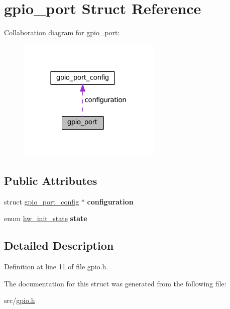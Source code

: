 \hypertarget{structgpio__port}{}\section{gpio\+\_\+port Struct Reference}
\label{structgpio__port}


Collaboration diagram for gpio\+\_\+port\+:\nopagebreak
\begin{figure}[H]
\begin{center}
\leavevmode
\includegraphics[width=194pt]{structgpio__port__coll__graph}
\end{center}
\end{figure}
\subsection*{Public Attributes}
\begin{DoxyCompactItemize}
\item 
\hypertarget{structgpio__port_ad67106287ff2c5d84c528b731374d5e8}{}struct \hyperlink{structgpio__port__config}{gpio\+\_\+port\+\_\+config} $\ast$ {\bfseries configuration}\label{structgpio__port_ad67106287ff2c5d84c528b731374d5e8}

\item 
\hypertarget{structgpio__port_acc0ba075ca33d19af55b06b16edd7ac6}{}enum \hyperlink{hw_8h_a3c02952100e7d051b77cdf060ca0ba9b}{hw\+\_\+init\+\_\+state} {\bfseries state}\label{structgpio__port_acc0ba075ca33d19af55b06b16edd7ac6}

\end{DoxyCompactItemize}


\subsection{Detailed Description}


Definition at line 11 of file gpio.\+h.



The documentation for this struct was generated from the following file\+:\begin{DoxyCompactItemize}
\item 
src/\hyperlink{gpio_8h}{gpio.\+h}\end{DoxyCompactItemize}
